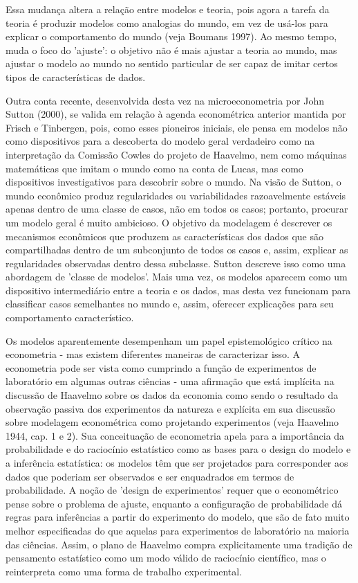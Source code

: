 \documentclass[a4paper,12pt]{article}[abntex2]
\begin{document}
Essa mudança altera a relação entre modelos e teoria, pois agora a tarefa da teoria é produzir modelos como analogias do mundo, em vez de usá-los para explicar o comportamento do mundo (veja Boumans 1997). Ao mesmo tempo, muda o foco do 'ajuste': o objetivo não é mais ajustar a teoria ao mundo, mas ajustar o modelo ao mundo no sentido particular de ser capaz de imitar certos tipos de características de dados.

Outra conta recente, desenvolvida desta vez na microeconometria por John Sutton (2000), se valida em relação à agenda econométrica anterior mantida por Frisch e Tinbergen, pois, como esses pioneiros iniciais, ele pensa em modelos não como dispositivos para a descoberta do modelo geral verdadeiro como na interpretação da Comissão Cowles do projeto de Haavelmo, nem como máquinas matemáticas que imitam o mundo como na conta de Lucas, mas como dispositivos investigativos para descobrir sobre o mundo. Na visão de Sutton, o mundo econômico produz regularidades ou variabilidades razoavelmente estáveis apenas dentro de uma classe de casos, não em todos os casos; portanto, procurar um modelo geral é muito ambicioso. O objetivo da modelagem é descrever os mecanismos econômicos que produzem as características dos dados que são compartilhadas dentro de um subconjunto de todos os casos e, assim, explicar as regularidades observadas dentro dessa subclasse. Sutton descreve isso como uma abordagem de 'classe de modelos'. Mais uma vez, os modelos aparecem como um dispositivo intermediário entre a teoria e os dados, mas desta vez funcionam para classificar casos semelhantes no mundo e, assim, oferecer explicações para seu comportamento característico.

Os modelos aparentemente desempenham um papel epistemológico crítico na econometria - mas existem diferentes maneiras de caracterizar isso. A econometria pode ser vista como cumprindo a função de experimentos de laboratório em algumas outras ciências - uma afirmação que está implícita na discussão de Haavelmo sobre os dados da economia como sendo o resultado da observação passiva dos experimentos da natureza e explícita em sua discussão sobre modelagem econométrica como projetando experimentos (veja Haavelmo 1944, cap. 1 e 2). Sua conceituação de econometria apela para a importância da probabilidade e do raciocínio estatístico como as bases para o design do modelo e a inferência estatística: os modelos têm que ser projetados para corresponder aos dados que poderiam ser observados e ser enquadrados em termos de probabilidade. A noção de 'design de experimentos' requer que o econométrico pense sobre o problema de ajuste, enquanto a configuração de probabilidade dá regras para inferências a partir do experimento do modelo, que são de fato muito melhor especificadas do que aquelas para experimentos de laboratório na maioria das ciências. Assim, o plano de Haavelmo compra explicitamente uma tradição de pensamento estatístico como um modo válido de raciocínio científico, mas o reinterpreta como uma forma de trabalho experimental.
\end{document}

